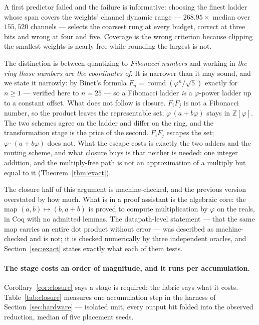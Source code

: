\documentclass[11pt]{article}
\theoremstyle{definition}
\begin{document}
A first predictor failed and the failure is informative: choosing the finest
ladder whose span covers the weights' channel dynamic range ---
$268.95\times$ median over $155{,}520$ channels --- selects the coarsest rung at
every budget, correct at three bits and wrong at four and five. Coverage is the
wrong criterion because clipping the smallest weights is nearly free while
rounding the largest is not.

The distinction is between quantizing to \emph{Fibonacci numbers} and working in
\emph{the ring those numbers are the coordinates of}. It is narrower than it may
sound, and we state it narrowly: by Binet's formula $F_n = \operatorname{round}
(\varphi^{n}/\sqrt5)$ exactly for $n \ge 1$ --- verified here to $n = 25$ --- so a
Fibonacci ladder \emph{is} a $\varphi$-power ladder up to a constant offset. What
does not follow is closure. $F_iF_j$ is not a Fibonacci number, so the product
leaves the representable set; $\varphi\,(a+b\varphi)$ stays in
$\mathbb{Z}[\varphi]$. The two schemes agree on the ladder and differ on the
ring, and the transformation stage is the price of the second. $F_iF_j$ escapes the set;
$\varphi\cdot(a+b\varphi)$ does not. What the escape costs is exactly the two
adders and the routing scheme, and what closure buys is that neither is needed:
one integer addition, and the multiply-free path is not an approximation of a
multiply but equal to it (Theorem~\ref{thm:exact}).

The closure half of this argument is machine-checked, and the previous version
overstated by how much. What is in a proof assistant is the algebraic core: the
map $(a,b)\mapsto(b,a+b)$ is proved to compute multiplication by $\varphi$ on the
reals, in Coq with no admitted lemmas. The datapath-level statement --- that the
same map carries an entire dot product without error --- was described as
machine-checked and is not; it is checked numerically by three independent
oracles, and Section~\ref{sec:exact} states exactly what each of them tests.

\paragraph{The stage costs an order of magnitude, and it runs per accumulation.}
Corollary~\ref{cor:closure} says a stage is required; the fabric says what it
costs. Table~\ref{tab:closure} measures one accumulation step in the harness of
Section~\ref{sec:hardware} --- isolated unit, every output bit folded into the
observed reduction, median of five placement seeds.
\end{document}
